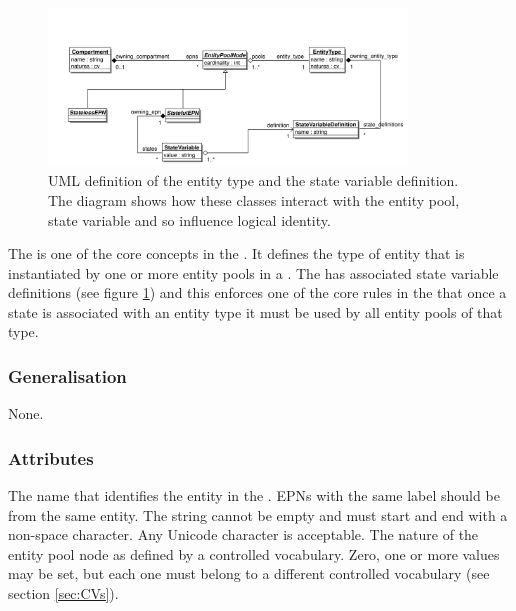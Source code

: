 \begin{figure}[htb]
  \centering
  \includegraphics[width=0.85\textwidth]{images/entitytypeuml}
\caption{UML definition of the entity type and the state variable
  definition. The diagram shows how these classes interact with the
  entity pool, state variable and so influence
   logical identity.}
  \label{fig:entitytypeuml}
\end{figure}
 
The  is one of the core concepts in the \PDl. It
defines the type of entity that is instantiated by one or more
entity pools in a \PDm. The  has associated
state variable definitions (see figure \ref{fig:entitytypeuml}) and
this enforces one of the core rules in the \PDl that once a state is
associated with an entity type it must be used by all entity pools of
that type.


\subsubsection{Generalisation}

None.

\subsubsection{Attributes}

\begin{attributes}
   The name that identifies the entity in the
  \PDm. EPNs with the same label should be from the same entity. The
  string cannot be empty and must start and end with a non-space
  character. Any Unicode character is acceptable.
   The nature of the entity pool node as defined
  by a controlled vocabulary. Zero, one or more values may be set, but
  each one must belong to a different controlled vocabulary (see
  section \ref{sec:CVs}).
\end{attributes}


